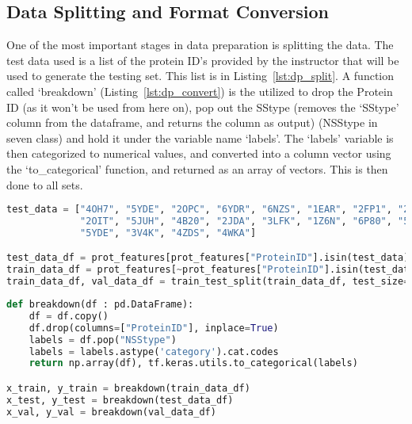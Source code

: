 \documentclass[12pt,letterpaper,oneside,reqno]{book}
\theoremstyle{plain}
\theoremstyle{definition}
\theoremstyle{plain}
\theoremstyle{remark}
\theoremstyle{plain}
\theoremstyle{definition}
\theoremstyle{plain}
\begin{document}
\subsection{Data Splitting and Format Conversion} %
\label{sec412}
One of the most important stages in data preparation is splitting the data. The test data used is a list of the protein ID's provided by the instructor that will be used to generate the testing set. This list is in Listing~\ref{lst:dp_split}. A function called `breakdown' (Listing~\ref{lst:dp_convert}) is the utilized to drop the Protein ID (as it won't be used from here on), pop out the SStype (removes the `SStype' column from the dataframe, and returns the column as output) (NSStype in seven class) and hold it under the variable name `labels'. The `labels' variable is then categorized to numerical values, and converted into a column vector using the `to\_categorical' function, and returned as an array of vectors. This is then done to all sets.
\begin{lstlisting}[language=Python, caption={Code for Splitting the Data}, label = lst:dp_split, frame=single]
test_data = ["4OH7", "5YDE", "2OPC", "6YDR", "6NZS", "1EAR", "2FP1", "2Z6R",
             "2OIT", "5JUH", "4B20", "2JDA", "3LFK", "1Z6N", "6P80", "5UEB",
             "5YDE", "3V4K", "4ZDS", "4WKA"]

test_data_df = prot_features[prot_features["ProteinID"].isin(test_data)]
train_data_df = prot_features[~prot_features["ProteinID"].isin(test_data)]
train_data_df, val_data_df = train_test_split(train_data_df, test_size=0.1)
\end{lstlisting}
\begin{lstlisting}[language=Python, caption={Code for Breaking Down and Converting the Data}, label = lst:dp_convert, frame=single]
def breakdown(df : pd.DataFrame):
    df = df.copy()
    df.drop(columns=["ProteinID"], inplace=True)
    labels = df.pop("NSStype")
    labels = labels.astype('category').cat.codes
    return np.array(df), tf.keras.utils.to_categorical(labels)

x_train, y_train = breakdown(train_data_df)
x_test, y_test = breakdown(test_data_df)
x_val, y_val = breakdown(val_data_df)
\end{lstlisting}
\end{document}
